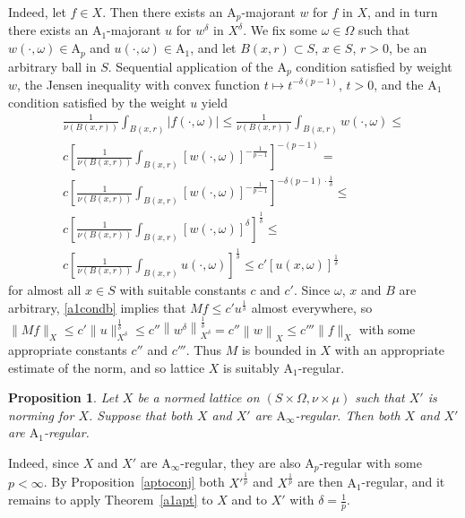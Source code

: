 \documentclass[12pt]{amsart}
\newtheorem {proposition} [theorem] {Proposition}
\newcommand {\apclass} [1] {\ensuremath{\mathrm A_{#1}}}
\newcommand {\weightu} {\ensuremath {\mathit u}}
\newcommand {\weightw} {\ensuremath {\mathit w}}
\begin{document}
Indeed, let $f \in X$.  Then there exists an $\apclass {p}$-majorant $\weightw$ for $f$ in $X$,
and in turn there exists an $\apclass {1}$-majorant $\weightu$ for $\weightw^\delta$ in $X^\delta$.
We fix some $\omega \in \Omega$ such that
$\weightw (\cdot, \omega) \in \apclass {p}$ and $\weightu (\cdot, \omega) \in \apclass {1}$,
and let $B (x, r) \subset S$, $x \in S$, $r > 0$, be an arbitrary ball in $S$.
Sequential application of the $\apclass {p}$ condition satisfied by weight $\weightw$,
the Jensen inequality with convex function $t \mapsto t^{-\delta (p - 1)}$, $t > 0$,
and the $\apclass {1}$ condition satisfied by the weight $\weightu$
yield
\begin {multline}
\label {a1condb}
\frac 1 {\nu (B (x, r))} \int_{B (x, r)} |f (\cdot, \omega)| \leqslant
\frac 1 {\nu (B (x, r))} \int_{B (x, r)} \weightw (\cdot, \omega) \leqslant
\\
c \left[ \frac 1 {\nu (B (x, r))} \int_{B (x, r)} [\weightw (\cdot, \omega)]^{-\frac 1 {p - 1}} \right]^{-(p - 1)} =
\\
c \left[ \frac 1 {\nu (B (x, r))} \int_{B (x, r)} [\weightw (\cdot, \omega)]^{-\frac 1 {p - 1}} \right]^{-\delta (p - 1) \cdot \frac 1 \delta} \leqslant
\\
c \left[ \frac 1 {\nu (B (x, r))} \int_{B (x, r)} [\weightw (\cdot, \omega)]^\delta  \right]^{\frac 1 \delta} \leqslant
\\
c \left[ \frac 1 {\nu (B (x, r))} \int_{B (x, r)} \weightu (\cdot, \omega) \right]^{\frac 1 \delta} \leqslant
c' \left[\weightu (x, \omega)\right]^{\frac 1 \delta}
\end {multline}
for almost all $x \in S$ with suitable constants $c$ and $c'$.
Since $\omega$, $x$ and $B$ are arbitrary, \eqref {a1condb} implies that $M f \leqslant c' \weightu^{\frac 1 \delta}$
almost everywhere, so
$\|M f\|_X \leqslant c' \|\weightu\|_{X^\delta}^{\frac 1 \delta} \leqslant
c'' \left\|\weightw^{\delta}\right\|_{X^\delta}^{\frac 1 \delta} =
c'' \left\|\weightw\right\|_{X} \leqslant c''' \|f\|_X$
with some appropriate constants $c''$ and $c'''$.  Thus $M$ is bounded in $X$ with an appropriate estimate
of the norm, and so lattice $X$ is suitably $\apclass {1}$-regular.

\begin {proposition}
\label {ainfainf}
Let $X$ be a normed lattice on $(S \times \Omega, \nu \times \mu)$ such that $X'$ is norming for $X$.
Suppose that both $X$ and $X'$ are $\apclass {\infty}$-regular.
Then both $X$ and $X'$ are $\apclass {1}$-regular.
\end {proposition}
Indeed, since $X$ and $X'$ are $\apclass {\infty}$-regular, they are also $\apclass {p}$-regular with some $p < \infty$.
By Proposition~\ref {aptoconj} both $X'^{\frac 1 p}$ and $X^{\frac 1 p}$ are then $\apclass {1}$-regular,
and it remains to apply Theorem~\ref {a1apt} to $X$ and to $X'$
with $\delta = \frac 1 p$.
\end{document}
